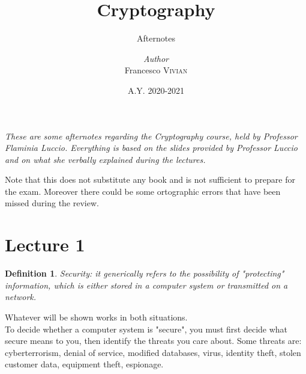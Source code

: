\documentclass[a4paper, 12pt]{report}
\institute{Ca' Foscari University}
\title{Cryptography}
\subtitle{Afternotes}
\author{\textit{Author}\\Francesco \textsc{Vivian}}
\date{A.Y. 2020-2021}
\newtheorem{definition}{\textbf{Definition}}
\begin{document}
    \maketitle
\newpage


{\itshape
   	These are some afternotes regarding the Cryptography course, held by Professor Flaminia Luccio. Everything is based on the slides provided by Professor Luccio and on what she verbally explained during the lectures. 
   	
   	Note that this does not substitute any book and is not sufficient to prepare for the exam. Moreover there could be some ortographic errors that have been missed during the review. 
}	
\newpage
\chapter*{Lecture 1}
\begin{definition}
	Security: it generically refers to the possibility of "protecting" information, which is either stored in a computer system or transmitted on a network.
\end{definition}
Whatever will be shown works in both situations.\\
To decide whether a computer system is "secure", you must first decide what secure means to you, then identify the threats you care about. Some threats are: cyberterrorism, denial of service, modified databases, virus, identity theft, stolen customer data, equipment theft, espionage.
\end{document}
